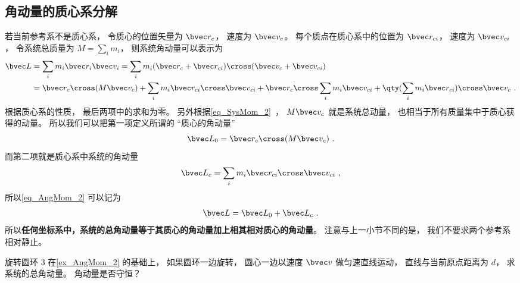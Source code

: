 \subsection{角动量的质心系分解}
若当前参考系不是质心系， 令质心的位置矢量为 $\bvec r_c$， 速度为 $\bvec v_c$。 每个质点在质心系中的位置为 $\bvec r_{ci}$， 速度为 $\bvec v_{ci}$， 令系统总质量为 $M = \sum_i m_i$， 则系统角动量可以表示为
\begin{equation}\label{eq_AngMom_2}
\begin{aligned}
\bvec L &= \sum_i m_i \bvec r_i \bvec v_i = \sum_i m_i (\bvec r_c + \bvec r_{ci})\cross( \bvec v_c + \bvec v_{ci})\\
&= \bvec r_c \cross (M\bvec v_c) + \sum_i m_i \bvec r_{ci}\cross \bvec v_{ci} + \bvec r_c \cross \sum_i m_i \bvec v_{ci} + \qty(\sum_i m_i \bvec r_{ci}) \cross \bvec v_c~.
\end{aligned}
\end{equation}
根据质心系的性质， 最后两项中的求和为零。 另外根据\autoref{eq_SysMom_2}~， $M\bvec v_c$ 就是系统总动量， 也相当于所有质量集中于质心获得的动量。 所以我们可以把第一项定义所谓的 “质心的角动量”
\begin{equation}
\bvec L_0 = \bvec r_c \cross (M \bvec v_c)~.
\end{equation}
而第二项就是质心系中系统的角动量
\begin{equation}
\bvec L_c = \sum_i m_i \bvec r_{ci}\cross \bvec v_{ci}~,
\end{equation}
所以\autoref{eq_AngMom_2} 可以记为
\begin{equation}\label{eq_AngMom_3}
\bvec L = \bvec L_0 + \bvec L_c~.
\end{equation}
所以\textbf{任何坐标系中，系统的总角动量等于其质心的角动量加上相其相对质心的角动量}。 注意与上一小节不同的是， 我们不要求两个参考系相对静止。

\begin{exercise}{旋转圆环 3}
在\autoref{ex_AngMom_2} 的基础上， 如果圆环一边旋转， 圆心一边以速度 $\bvec v$ 做匀速直线运动， 直线与当前原点距离为 $d$， 求系统的总角动量。 角动量是否守恒？
\end{exercise}
